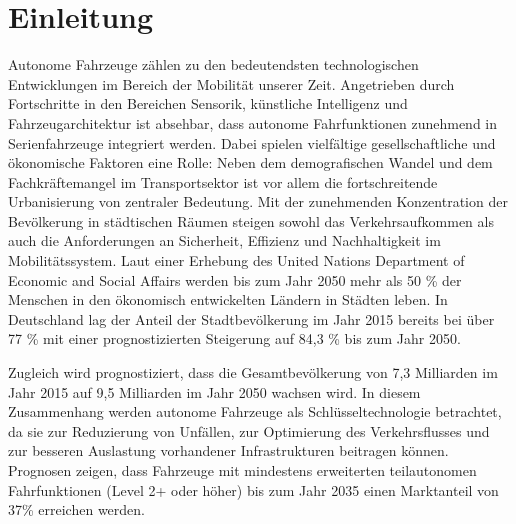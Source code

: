 \chapter{Einleitung}

Autonome Fahrzeuge zählen zu den bedeutendsten technologischen Entwicklungen im Bereich der Mobilität unserer Zeit. Angetrieben durch Fortschritte in den Bereichen Sensorik, künstliche Intelligenz und Fahrzeugarchitektur ist absehbar, dass autonome Fahrfunktionen zunehmend in Serienfahrzeuge integriert werden. Dabei spielen vielfältige gesellschaftliche und ökonomische Faktoren eine Rolle: Neben dem demografischen Wandel und dem Fachkräftemangel im Transportsektor ist vor allem die fortschreitende Urbanisierung von zentraler Bedeutung. Mit der zunehmenden Konzentration der Bevölkerung in städtischen Räumen steigen sowohl das Verkehrsaufkommen als auch die Anforderungen an Sicherheit, Effizienz und Nachhaltigkeit im Mobilitätssystem. Laut einer Erhebung des United Nations Department of Economic and Social Affairs \cite{bpb2017} werden bis zum Jahr 2050 mehr als 50 \% der Menschen in den ökonomisch entwickelten Ländern in Städten leben. In Deutschland lag der Anteil der Stadtbevölkerung im Jahr 2015 bereits bei über 77 \% mit einer prognostizierten Steigerung auf 84,3 \% bis zum Jahr 2050. \cite{Statista2025}

\begin{center}
\end{center}

Zugleich wird prognostiziert, dass die Gesamtbevölkerung von 7,3 Milliarden im Jahr 2015 auf 9,5 Milliarden im Jahr 2050 wachsen wird. In diesem Zusammenhang werden autonome Fahrzeuge als Schlüsseltechnologie betrachtet, da sie zur Reduzierung von Unfällen, zur Optimierung des Verkehrsflusses und zur besseren Auslastung vorhandener Infrastrukturen beitragen können. Prognosen zeigen, dass Fahrzeuge mit mindestens erweiterten teilautonomen Fahrfunktionen (Level 2+ oder höher) bis zum Jahr 2035 einen Marktanteil von 37\% erreichen werden. 

